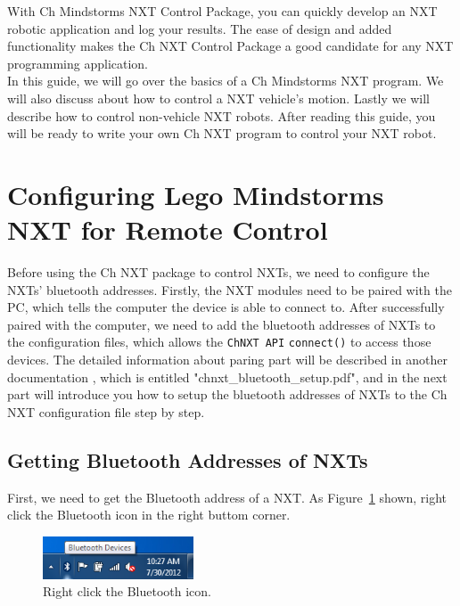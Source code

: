 \documentclass[11pt]{article}
\begin{document}
With Ch Mindstorms NXT Control Package, you can quickly develop an NXT robotic application and log 
your results. The ease of design and added functionality makes the Ch NXT Control Package a good 
candidate for any NXT programming application.\\

In this guide, we will go over the basics of a Ch Mindstorms NXT program. We will also discuss 
about how to control a NXT vehicle's motion. Lastly we will describe how to control non-vehicle
NXT robots. After reading this guide, you will be ready to write your own Ch NXT program to 
control your NXT robot.

\newpage
\section{Configuring Lego Mindstorms NXT for Remote Control}
Before using the Ch NXT package to control NXTs, we need to configure the NXTs' bluetooth addresses.
Firstly, the NXT modules need to be paired with the PC, which tells the computer the device is able
to connect to. After successfully paired with the computer, we need to add the bluetooth addresses of
NXTs to the configuration files, which allows the {\tt ChNXT API} {\tt connect()} to access
those devices. The detailed information about paring part will be described in another documentation
, which is entitled "chnxt\_bluetooth\_setup.pdf", and in the next part will introduce you how to 
setup the bluetooth addresses of NXTs to the Ch NXT configuration file step by step.

\subsection{Getting Bluetooth Addresses of NXTs}
First, we need to get the Bluetooth address of a NXT. As Figure~\ref{fig:bt_device} shown, right click
the Bluetooth icon in the right buttom corner.

\begin{figure}[H]
  \begin{center}
    \includegraphics[height=0.5in]{figure/configuration/getBTaddress/bt1.png}
    \caption{Right click the Bluetooth icon.\label{fig:bt_device}}
  \end{center}
\end{figure}
\end{document}
